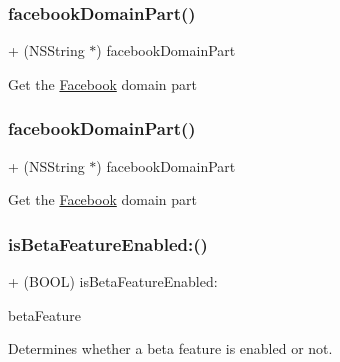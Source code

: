 \subsubsection{\texorpdfstring{facebook\+Domain\+Part()}{facebookDomainPart()}\hspace{0.1cm}{\footnotesize\ttfamily [4/5]}}
{\footnotesize\ttfamily + (N\+S\+String $\ast$) facebook\+Domain\+Part \begin{DoxyParamCaption}{ }\end{DoxyParamCaption}}

Get the \hyperlink{interfaceFacebook}{Facebook} domain part \mbox{\label{interfaceFBSettings_a7ce923f25dd500f81ce518e998bf2f39}} 
\subsubsection{\texorpdfstring{facebook\+Domain\+Part()}{facebookDomainPart()}\hspace{0.1cm}{\footnotesize\ttfamily [5/5]}}
{\footnotesize\ttfamily + (N\+S\+String $\ast$) facebook\+Domain\+Part \begin{DoxyParamCaption}{ }\end{DoxyParamCaption}}

Get the \hyperlink{interfaceFacebook}{Facebook} domain part \mbox{\label{interfaceFBSettings_a16d812cddbf44b8d354393d68757945f}} 
\subsubsection{\texorpdfstring{is\+Beta\+Feature\+Enabled\+:()}{isBetaFeatureEnabled:()}\hspace{0.1cm}{\footnotesize\ttfamily [1/5]}}
{\footnotesize\ttfamily + (B\+O\+OL) is\+Beta\+Feature\+Enabled\+: \begin{DoxyParamCaption}\item[{(F\+B\+Beta\+Features)}]{beta\+Feature }\end{DoxyParamCaption}}

Determines whether a beta feature is enabled or not.


